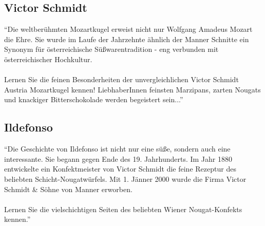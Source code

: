\subsection{Victor Schmidt}
\enquote{Die weltberühmten Mozartkugel erweist nicht nur Wolfgang Amadeus Mozart die Ehre. Sie wurde im Laufe der Jahrzehnte ähnlich der Manner Schnitte ein Synonym für österreichische Süßwarentradition - eng verbunden mit österreichischer Hochkultur.\\\\
Lernen Sie die feinen Besonderheiten der unvergleichlichen Victor Schmidt Austria Mozartkugel kennen! LiebhaberInnen feinsten Marzipans, zarten Nougats und knackiger Bitterschokolade werden begeistert sein...}\cite{josef_manner_marken}

\subsection{Ildefonso}
\enquote{Die Geschichte von Ildefonso ist nicht nur eine süße, sondern auch eine interessante. Sie begann gegen Ende des 19. Jahrhunderts. Im Jahr 1880 entwickelte ein Konfektmeister von Victor Schmidt die feine Rezeptur des beliebten Schicht-Nougatwürfels. Mit 1. Jänner 2000 wurde die Firma Victor Schmidt \& Söhne von Manner erworben.\\\\
Lernen Sie die vielschichtigen Seiten des beliebten Wiener Nougat-Konfekts kennen.}\cite{josef_manner_marken}
\newpage
